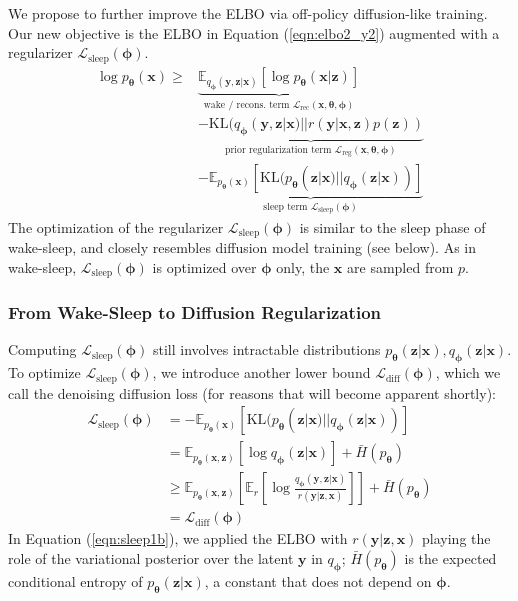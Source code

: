 \documentclass[letterpaper]{article} %
\newcommand{\bx}{\mathbf{x}}
\newcommand{\bz}{\mathbf{z}}
\newcommand{\by}{\mathbf{y}}
\newcommand\Exp{\mathbb{E}}
\newcommand\KL{\text{KL}}
\newcommand\Lc{\mathcal{L}}
\let\oldtheta\theta
\renewcommand{\theta}{{\boldsymbol \oldtheta}}
\let\oldphi\phi
\renewcommand{\phi}{{\boldsymbol \oldphi}}
\begin{document}
We propose to further improve the ELBO via off-policy diffusion-like training. Our new objective is the ELBO in Equation (\ref{eqn:elbo2_y2}) augmented with a regularizer $\Lc_\text{sleep}(\phi)$.
\begin{align} \label{eqn:objective}
\log p_\theta(\bx) \geq &
 \underbrace{\Exp_{q_\phi(\by,\bz|\bx)} [\log p_\theta(\bx|\bz)]}_\text{wake / recons. term $\Lc_\text{rec}(\bx,\theta,\phi)$} \\ \nonumber & \underbrace{-\KL(q_\phi(\by,\bz|\bx)||r(\by|\bx,\bz)p(\bz))}_\text{prior regularization term $\mathcal{L}_\text{reg}(\bx,\theta,\phi)$} \\ \nonumber & \underbrace{-\Exp_{p_\theta(\bx)} [\KL(p_\theta(\bz|\bx)||q_\phi(\bz|\bx))]}_\text{sleep term $\Lc_\text{sleep}(\phi)$}
\end{align}
The optimization of the regularizer $\Lc_\text{sleep}(\phi)$ is similar to the sleep phase of wake-sleep, and closely resembles diffusion model training (see below). 
As in wake-sleep, $\Lc_\text{sleep}(\phi)$ is optimized over $\phi$ only, the $\bx$ are sampled from $p$.

\subsubsection{From Wake-Sleep to Diffusion Regularization}

Computing $\Lc_\text{sleep}(\phi)$ still involves intractable distributions $p_\theta(\bz|\bx), q_\phi(\bz|\bx)$.
To optimize $\Lc_\text{sleep}(\phi)$, we introduce another lower bound $\Lc_\text{diff}(\phi)$, which we call the denoising diffusion loss (for reasons that will become apparent shortly):
\begin{align}
\label{eqn:sleep1b}
\Lc_\text{sleep}(\phi) 
& = - \Exp_{p_\theta(\bx)} [\KL(p_\theta(\bz|\bx)||q_\phi(\bz|\bx))] \\ \nonumber
& = \Exp_{p_\theta(\bx,\bz)} [\log {q_\phi(\bz|\bx)}] + \bar H(p_\theta) \\ \nonumber
& \geq \Exp_{p_\theta(\bx,\bz)} \left[ \Exp_{r} [\log \frac{ q_\phi(\by,\bz|\bx)} {r(\by|\bz,\bx) }] \right] + \bar H(p_\theta) \\ \nonumber
& = \Lc_\text{diff}(\phi)
\end{align}
In Equation (\ref{eqn:sleep1b}), we applied the ELBO with $r(\by|\bz,\bx)$ playing the role of the variational posterior over the latent $\by$ in $q_\phi$; $\bar H(p_\theta)$ is the expected conditional entropy of $p_\theta(\bz|\bx)$, a constant that does not depend on $\phi$.
\end{document}
